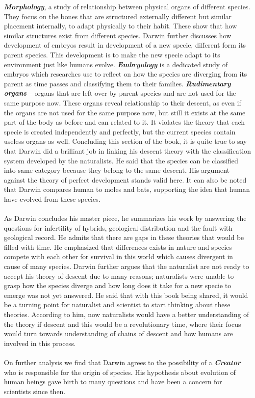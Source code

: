 \documentclass{article}
\begin{document}
	\textbf{\textit{Morphology}}, a study of relationship between physical organs of different species. They focus on the bones that are structured externally different but similar placement internally, to adapt physically to their habit. These show that how similar structures exist from different species. Darwin further discusses how development of embryos result in development of a new specie, different form its parent species. This development is to make the new specie adapt to its environment just like humans evolve. \textbf{\textit{Embryology}} is a dedicated study of embryos which researches use to reflect on how the species are diverging from its parent as time passes and classifying them to their families. \textbf{\textit{Rudimentary organs}} – organs that are left over by parent species and are not used for the same purpose now. These organs reveal relationship to their descent, as even if the organs are not used for the same purpose now, but still it exists at the same part of the body as before and can related to it. It violates the theory that each specie is created independently and perfectly, but the current species contain useless organs as well. 
Concluding this section of the book, it is quite true to say that Darwin did a brilliant job in linking his descent theory with the classification system developed by the naturalists. He said that the species can be classified into same category because they belong to the same descent. His argument against the theory of perfect development stands valid here. It can also be noted that Darwin compares human to moles and bats, supporting the idea that human have evolved from these species. \\ \\
	As Darwin concludes his master piece, he summarizes his work by answering the questions for infertility of hybrids, geological distribution and the fault with geological record. He admits that there are gaps in these theories that would be filled with time. He emphasized that differences exists in nature and species compete with each other for survival in this world which causes divergent in cause of many species. Darwin further argues that the naturalist are not ready to accept his theory of descent due to many reasons; naturalists were unable to grasp how the species diverge and how long does it take for a new specie to emerge was not yet answered. He said that with this book being shared, it would be a turning point for naturalist and scientist to start thinking about these theories. According to him, now naturalists would have a better understanding of the theory if descent and this would be a revolutionary time, where their focus would turn towards understanding of chains of descent and how humans are involved in this process. \\ \\
	On further analysis we find that Darwin agrees to the possibility of a \textbf{\textit{Creator}} who is responsible for the origin of species. His hypothesis about evolution of human beings gave birth to many questions and have been a concern for scientists since then.
\end{document}
